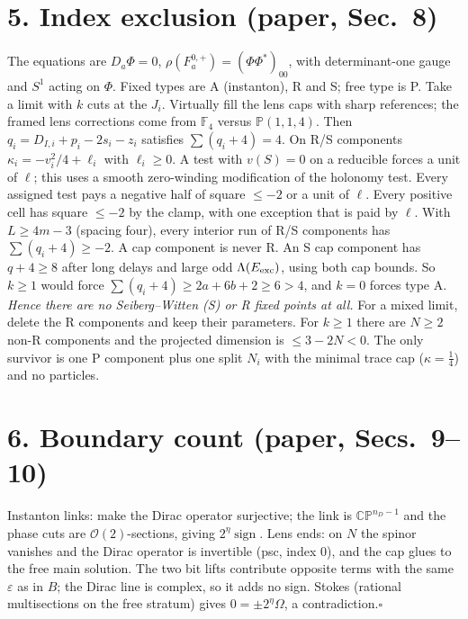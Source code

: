 \documentclass[10pt]{amsart}
\newcommand{\CP}{\mathbb{CP}}\newcommand{\PD}{\operatorname{PD}}
\begin{document}
\section*{5. Index exclusion (paper, Sec.~8)}
The equations are $D_a\Phi=0$, $\rho(F_a^{0,+})=(\Phi\Phi^*)_{00}$, with
determinant-one gauge and $S^1$ acting on $\Phi$. Fixed types are A
(instanton), R and S; free type is P. Take a limit with $k$ cuts at the
$J_i$. Virtually fill the lens caps with sharp references; the framed lens
corrections come from $\mathbb F_4$ versus $\mathbb P(1,1,4)$. Then
$q_i=D_{I,i}+p_i-2s_i-z_i$ satisfies $\sum(q_i+4)=4$.
On R/S components $\kappa_i=-v_i^2/4+\ell_i$ with $\ell_i\ge0$. A test with
$v(S)=0$ on a reducible forces a unit of $\ell$; this uses a smooth
zero-winding modification of the holonomy test. Every assigned test pays a
negative half of square $\le-2$ or a unit of $\ell$. Every positive cell has
square $\le-2$ by the clamp, with one exception that is paid by $\ell$.
With $L\ge4m-3$ (spacing four), every interior run of R/S components has
$\sum(q_i+4)\ge-2$. A cap component is never R. An S cap component has
$q+4\ge8$ after long delays and large odd $\Lambda(E_{\rm exc})$, using both
cap bounds. So $k\ge1$ would force $\sum(q_i+4)\ge2a+6b+2\ge6>4$, and
$k=0$ forces type A. \emph{Hence there are no Seiberg--Witten (S) or R fixed
points at all.} For a mixed limit, delete the R components and keep their
parameters. For $k\ge1$ there are $N\ge2$ non-R components and the projected
dimension is $\le3-2N<0$. The only survivor is one P
component plus one split $N_i$ with the minimal trace cap ($\kappa=\frac14$)
and no particles.

\section*{6. Boundary count (paper, Secs.~9--10)}
Instanton links: make the Dirac operator surjective; the link is
$\CP^{n_D-1}$ and the phase cuts are $\mathcal O(2)$-sections, giving
$2^\eta\operatorname{sign}$. Lens ends: on $N$ the spinor vanishes and the
Dirac operator is invertible (psc, index $0$), and the cap glues to the free
main solution. The two bit lifts contribute opposite terms with the same
$\varepsilon$ as in $B$; the Dirac line is complex, so it adds no sign.
Stokes (rational multisections on the free stratum) gives
$0=\pm2^\eta\Omega$, a contradiction.\hfill$\square$
\end{document}
